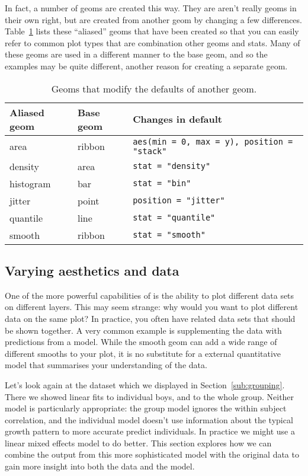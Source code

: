 In fact, a number of geoms are created this way.  They are aren't really geoms in their own right, but are created from another geom by changing a few differences.  Table~\ref{tbl:aliased-geoms} lists these ``aliased'' geoms that have been created so that you can easily refer to common plot types that are combination other geoms and stats.  Many of these geoms are used in a different manner to the base geom, and so the examples may be quite different, another reason for creating a separate geom.  

\begin{table}
  \begin{center}
  \begin{tabular}{lll}
    \toprule
    Aliased geom & Base geom & Changes in default \\
    \midrule
    area      & ribbon & \verb!aes(min = 0, max = y), position = "stack"!  \\
    density   & area   & \verb!stat = "density"!    \\
    histogram & bar    & \verb!stat = "bin"!        \\
    jitter    & point  & \verb!position = "jitter"! \\
    quantile  & line   & \verb!stat = "quantile"!   \\
    smooth    & ribbon & \verb!stat = "smooth"!     \\
    \bottomrule
  \end{tabular}
  \end{center}
  \caption{Geoms that modify the defaults of another geom.}
  \label{tbl:aliased-geoms}
\end{table}

\subsection{Varying aesthetics and data}
\label{sub:different_aesthetics}

One of the more powerful capabilities of \ggplot is the ability to plot different data sets on different layers.  This may seem strange: why would you want to plot different data on the same plot?  In practice, you often have related data sets that should be shown together.  A very common example is supplementing the data with predictions from a model.  While the smooth geom can add a wide range of different smooths to your plot, it is no substitute for a external quantitative model that summarises your understanding of the data.

Let's look again at the  dataset which we displayed in Section~\ref{sub:grouping}.  There we showed linear fits to individual boys, and to the whole group.  Neither model is particularly appropriate: the group model ignores the within subject correlation, and the individual model doesn't use information about the typical growth pattern to more accurate predict individuals.  In practice we might use a linear mixed effects model to do better.  This section explores how we can combine the output from this more sophisticated model with the original data to gain more insight into both the data and the model.

